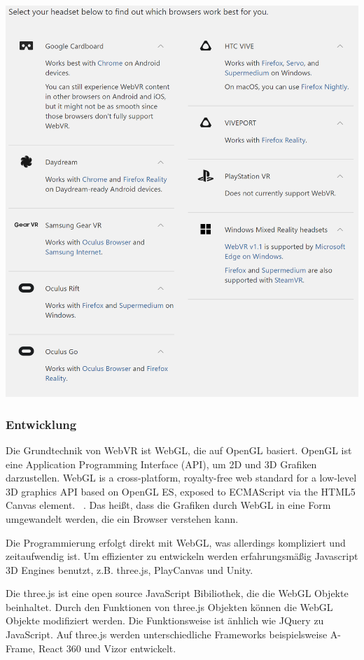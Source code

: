  \includegraphics[width=\textwidth]{images/supportedBrowsers.png}
 
  \subsubsection{Entwicklung}
 Die Grundtechnik von WebVR ist WebGL, die auf OpenGL basiert. OpenGL ist eine Application Programming Interface (API), um 2D und 3D Grafiken darzustellen. \glqq WebGL is a cross-platform, royalty-free web standard for a low-level 3D graphics API based on OpenGL ES, exposed to ECMAScript via the HTML5 Canvas element. \grqq\ \citep{23}. Das heißt, dass die Grafiken durch WebGL in eine Form umgewandelt werden, die ein Browser verstehen kann. 
 
 Die Programmierung erfolgt direkt mit WebGL, was allerdings kompliziert und zeitaufwendig ist. Um effizienter zu entwickeln werden erfahrungsmäßig Javascript 3D Engines benutzt, z.B. three.js, PlayCanvas und Unity.
 
 Die three.js ist eine open source JavaScript Bibiliothek, die die WebGL Objekte beinhaltet. Durch den Funktionen von three.js Objekten können die WebGL Objekte modifiziert werden. Die Funktionsweise ist änhlich wie JQuery zu JavaScript. Auf three.js werden unterschiedliche Frameworks beispielsweise A-Frame, React 360 und Vizor entwickelt.
 

